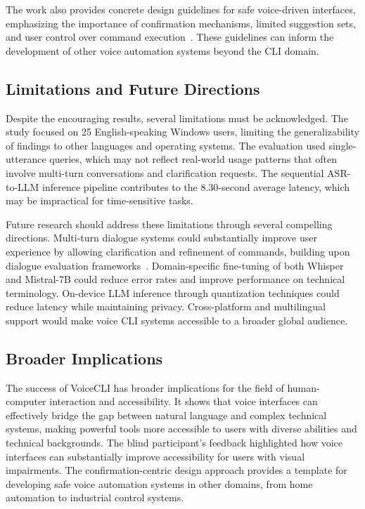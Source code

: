 \documentclass[a4paper,12pt]{article}
\begin{document}
The work also provides concrete design guidelines for safe voice-driven interfaces, emphasizing the importance of confirmation mechanisms, limited suggestion sets, and user control over command execution~\cite{ref25}. These guidelines can inform the development of other voice automation systems beyond the CLI domain.

\subsection{Limitations and Future Directions}

Despite the encouraging results, several limitations must be acknowledged. The study focused on 25 English-speaking Windows users, limiting the generalizability of findings to other languages and operating systems. The evaluation used single-utterance queries, which may not reflect real-world usage patterns that often involve multi-turn conversations and clarification requests. The sequential ASR-to-LLM inference pipeline contributes to the 8.30-second average latency, which may be impractical for time-sensitive tasks.

Future research should address these limitations through several compelling directions. Multi-turn dialogue systems could substantially improve user experience by allowing clarification and refinement of commands, building upon dialogue evaluation frameworks~\cite{ref19}. Domain-specific fine-tuning of both Whisper and Mistral-7B could reduce error rates and improve performance on technical terminology. On-device LLM inference through quantization techniques could reduce latency while maintaining privacy. Cross-platform and multilingual support would make voice CLI systems accessible to a broader global audience.

\subsection{Broader Implications}

The success of VoiceCLI has broader implications for the field of human-computer interaction and accessibility. It shows that voice interfaces can effectively bridge the gap between natural language and complex technical systems, making powerful tools more accessible to users with diverse abilities and technical backgrounds. The blind participant's feedback highlighted how voice interfaces can substantially improve accessibility for users with visual impairments. The confirmation-centric design approach provides a template for developing safe voice automation systems in other domains, from home automation to industrial control systems.
\end{document}
